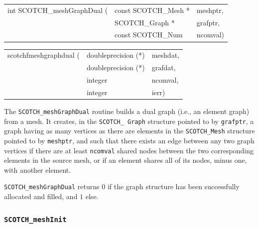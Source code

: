 \begin{itemize}
\progsyn

{\tt\begin{tabular}{l@{}ll}
int SCOTCH\_meshGraphDual ( & const SCOTCH\_Mesh * & meshptr, \\
                            & SCOTCH\_Graph *      & grafptr, \\
                            & const SCOTCH\_Num    & ncomval)
\end{tabular}}

{\tt\begin{tabular}{l@{}ll}
scotchfmeshgraphdual ( & doubleprecision (*) & meshdat, \\
                       & doubleprecision (*) & grafdat, \\
                       & integer             & ncomval, \\
                       & integer             & ierr)
\end{tabular}}

\progdes

The {\tt SCOTCH\_meshGraphDual} routine builds a dual graph (i.e., an
element graph) from a mesh. It creates, in the {\tt SCOTCH\_\lbt
  Graph} structure pointed to by {\tt grafptr}, a graph having as many
vertices as there are elements in the {\tt SCOTCH\_\lbt Mesh}
structure pointed to by {\tt meshptr}, and such that there exists an
edge between any two graph vertices if there are at least
{\tt ncomval} shared nodes between the two corresponding elements in the
source mesh, or if an element shares all of its nodes, minus one, with
another element.

\progret

{\tt SCOTCH\_meshGraphDual} returns $0$ if the graph structure has
been successfully allocated and filled, and $1$ else.
\end{itemize}

\subsubsection{{\tt SCOTCH\_meshInit}}
\label{sec-lib-func-meshinit}

